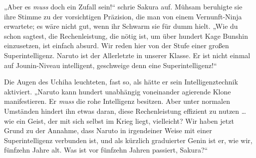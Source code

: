 „Aber es \emph{muss} doch ein Zufall sein!“ schrie Sakura auf. Mühsam beruhigte sie ihre Stimme zu der vorsichtigen Präzision, die man von einem Vernunft-Ninja erwartete; es wäre nicht gut, wenn ihr Schwarm sie für dumm hielt.
„Wie du schon sagtest, die Rechenleistung, die nötig ist, um über hundert Kage Bunshin einzusetzen, ist einfach absurd. Wir reden hier von der Stufe einer großen Superintelligenz. Naruto ist der Allerletzte in unserer Klasse. Er ist nicht einmal auf Jounin-Niveau intelligent, geschweige denn eine Superintelligenz!“

Die Augen des Uchiha leuchteten, fast so, als hätte er sein Intelligenztechnik aktiviert.
„Naruto kann hundert unabhängig voneinander agierende Klone manifestieren. Er \emph{muss} die rohe Intelligenz besitzen. Aber unter normalen Umständen hindert ihn etwas daran, diese Rechenleistung effizient zu nutzen … wie ein Geist, der mit sich selbst im Krieg liegt, vielleicht? Wir haben jetzt Grund zu der Annahme, dass Naruto in irgendeiner Weise mit einer Superintelligenz verbunden ist, und als kürzlich graduierter Genin ist er, wie wir, fünfzehn Jahre alt. Was ist vor fünfzehn Jahren passiert, Sakura?“

